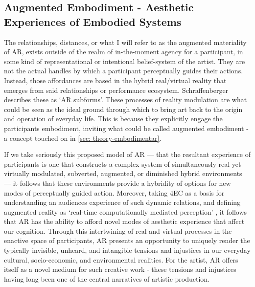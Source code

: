 \subsection[Augmented Embodiment]{Augmented Embodiment - Aesthetic Experiences of Embodied Systems} \label{sec: discussion-medium-embodiment}
The relationships, distances, or what I will refer to as the augmented materiality of AR, exists outside of the realm of in-the-moment agency for a participant, in some kind of representational or intentional belief-system of the artist. They are not the actual handles by which a participant perceptually guides their actions. Instead, those affordances are based in the hybrid real/virtual reality that emerges from said relationships or performance ecosystem. Schraffenberger describes these as `AR subforms'. These processes of reality modulation are what could be seen as the ideal ground through which to bring art back to the origin and operation of everyday life. This is because they explicitly engage the participants embodiment, inviting what could be called augmented embodiment - a concept touched on in \autoref{sec: theory-embodimentar}.

If we take seriously this proposed model of AR — that the resultant experience of participants is one that constructs a complex system of simultaneously real yet virtually modulated, subverted, augmented, or diminished hybrid environments — it follows that these environments provide a hybridity of options for new modes of perceptually guided action. Moreover, taking 4EC as a basis for understanding an audiences experience of such dynamic relations, and defining augmented reality as `real-time computationally mediated perception' \citep[]{chevalier2020}, it follows that AR has the ability to afford novel modes of aesthetic experience that affect our cognition. Through this intertwining of real and virtual processes in the enactive space of participants, AR presents an opportunity to uniquely render the typically invisible, unheard, and intangible tensions and injustices in our everyday cultural, socio-economic, and environmental realities. For the artist, AR offers itself as a novel medium for such creative work - these tensions and injustices having long been one of the central narratives of artistic production.

